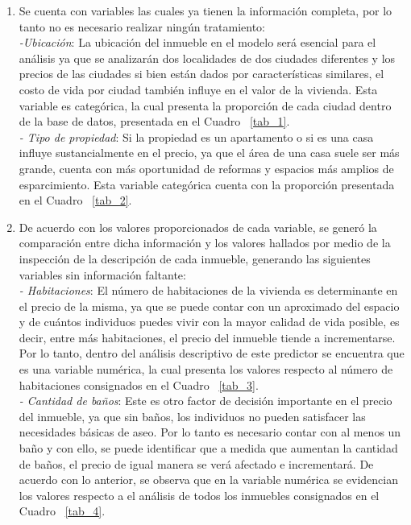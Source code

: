 \documentclass[conference, 10pt]{IEEEtran}
\begin{document}
\begin{enumerate}
	\item Se cuenta con variables las cuales ya tienen la información completa, por lo tanto no es necesario realizar ningún tratamiento:\\
\textit{-Ubicación}: La ubicación del inmueble en el modelo será esencial para el análisis ya que se analizarán dos localidades de dos ciudades diferentes y los precios de las ciudades si bien están dados por características similares, el costo de vida por ciudad también influye en el valor de la vivienda. Esta variable es categórica, la cual presenta la proporción de cada ciudad dentro de la base de datos, presentada en el Cuadro ~\ref{tab_1}.\\
\textit{-	Tipo de propiedad}: Si la propiedad es un apartamento o si es una casa influye sustancialmente en el precio, ya que el área de una casa suele ser más grande, cuenta con más oportunidad de reformas y espacios más amplios de esparcimiento. Esta variable categórica cuenta con la proporción  presentada en el Cuadro ~\ref{tab_2}.\\
 \item	De acuerdo con los valores proporcionados de cada variable, se generó la comparación entre dicha información y los valores hallados por medio de la inspección de la descripción de cada inmueble, generando las siguientes variables sin información faltante:\\
\textit{- Habitaciones}: El número de habitaciones de la vivienda es determinante en el precio de la misma, ya que se puede contar con un aproximado del espacio y de cuántos individuos puedes vivir con la mayor calidad de vida posible, es decir, entre más habitaciones, el precio del inmueble tiende a incrementarse. Por lo tanto, dentro del análisis descriptivo de este predictor se encuentra que es  una variable numérica, la cual presenta los valores respecto al número de habitaciones consignados en el Cuadro ~\ref{tab_3}.\\
\textit{-	Cantidad de baños}: Este es otro factor de decisión importante en el precio del inmueble, ya que sin baños, los individuos no pueden satisfacer las necesidades básicas de aseo. Por lo tanto es necesario contar con al menos un baño y con ello, se puede identificar que a medida que aumentan la cantidad de baños, el precio de igual manera se verá afectado e incrementará. De acuerdo con lo anterior, se observa que en la variable numérica se evidencian los valores respecto a el análisis de todos los inmuebles consignados en el Cuadro ~\ref{tab_4}. \

\end{enumerate}
\end{document}
